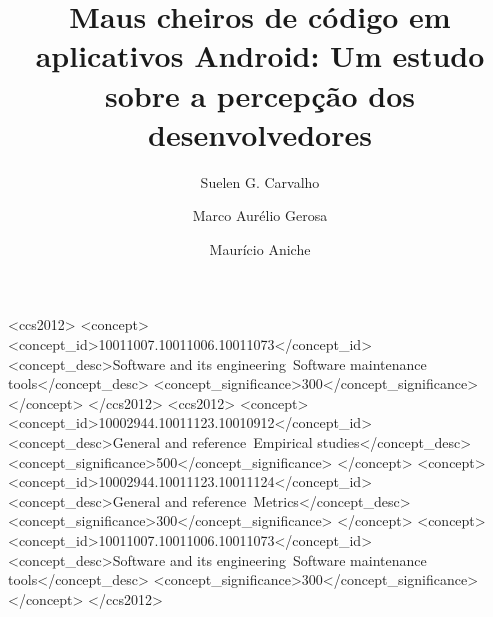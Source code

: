\documentclass[sigconf]{acmart}
\begin{document}
\title{Maus cheiros de código em aplicativos Android: Um estudo sobre a percepção dos desenvolvedores}


\author{Suelen G. Carvalho}

\author{Marco Aurélio Gerosa}

\author{Maurício Aniche}



\begin{abstract}

\end{abstract}

%
%
\begin{CCSXML}
<ccs2012>
  <concept>
    <concept_id>10011007.10011006.10011073</concept_id>
    <concept_desc>Software and its engineering~Software maintenance tools</concept_desc>
    <concept_significance>300</concept_significance>
  </concept>
</ccs2012>
<ccs2012>
  <concept>
    <concept_id>10002944.10011123.10010912</concept_id>
    <concept_desc>General and reference~Empirical studies</concept_desc>
    <concept_significance>500</concept_significance>
  </concept>
  <concept>
    <concept_id>10002944.10011123.10011124</concept_id>
    <concept_desc>General and reference~Metrics</concept_desc>
    <concept_significance>300</concept_significance>
  </concept>
  <concept>
    <concept_id>10011007.10011006.10011073</concept_id>
    <concept_desc>Software and its engineering~Software maintenance tools</concept_desc>
    <concept_significance>300</concept_significance>
  </concept>
</ccs2012>
\end{CCSXML}

\end{document}
